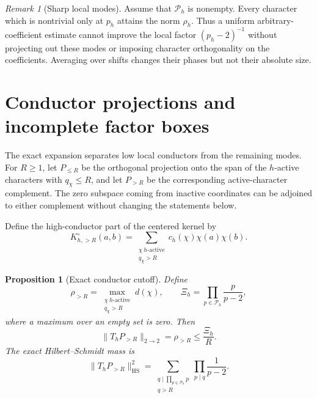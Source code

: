 \documentclass[11pt]{article}
\newtheorem{proposition}[theorem]{Proposition}
\theoremstyle{definition}
\theoremstyle{remark}
\newtheorem{remark}[theorem]{Remark}
\newcommand{\cP}{\mathcal P}
\begin{document}
\begin{remark}[Sharp local modes]\label{rem:sharp-local-modes}
Assume that $\cP_h$ is nonempty.  Every character which is nontrivial only at $p_h$ attains the norm $\rho_h$.  Thus a uniform arbitrary-coefficient estimate cannot improve the local factor $(p_h-2)^{-1}$ without projecting out these modes or imposing character orthogonality on the coefficients.  Averaging over shifts changes their phases but not their absolute size.
\end{remark}

\section{Conductor projections and incomplete factor boxes}\label{sec:boxes}

The exact expansion separates low local conductors from the remaining modes.  For $R\ge1$, let $P_{\le R}$ be the orthogonal projection onto the span of the $h$-active characters with $q_\chi\le R$, and let $P_{>R}$ be the corresponding active-character complement.  The zero subspace coming from inactive coordinates can be adjoined to either complement without changing the statements below.

Define the high-conductor part of the centered kernel by
\begin{equation}\label{eq:high-conductor-kernel}
 K_{h,>R}^\circ(a,b)
 =\sum_{\substack{\chi\ h\text{-active}\\q_\chi>R}}
 c_h(\chi)\chi(a)\chi(b).
\end{equation}

\begin{proposition}[Exact conductor cutoff]\label{prop:conductor-cutoff}
Define
\begin{equation}\label{eq:rho-conductor}
 \rho_{>R}
 =\max_{\substack{\chi\ h\text{-active}\\q_\chi>R}}d(\chi),
 \qquad
 \Xi_h=\prod_{p\in\cP_h}\frac{p}{p-2},
\end{equation}
where a maximum over an empty set is zero.  Then
\begin{equation}\label{eq:exact-high-conductor-norm}
 \|T_hP_{>R}\|_{2\to2}=\rho_{>R}
 \le\frac{\Xi_h}{R}.
\end{equation}
The exact Hilbert--Schmidt mass is
\begin{equation}\label{eq:high-conductor-hs}
 \|T_hP_{>R}\|_{\mathrm{HS}}^2
 =\sum_{\substack{q\mid\prod_{p\in\cP_h}p\\q>R}}
 \prod_{p\mid q}\frac1{p-2}.
\end{equation}
\end{proposition}
\end{document}
